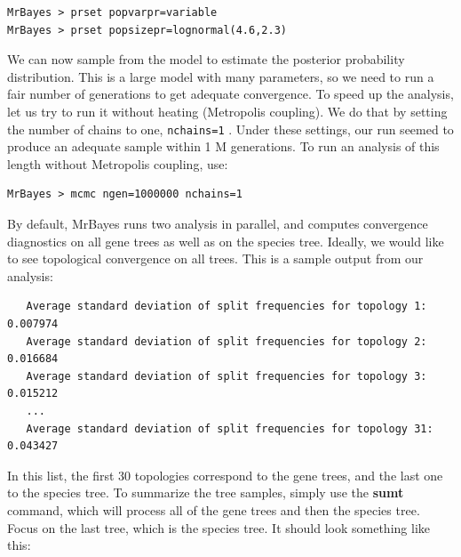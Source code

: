 \documentclass[12pt]{book}
\newcommand{\ttt}[1]{\texttt{#1} }
\begin{document}
\begin{singlespacing}
\begin{verbatim}
MrBayes > prset popvarpr=variable
MrBayes > prset popsizepr=lognormal(4.6,2.3)
\end{verbatim}
\end{singlespacing}

We can now sample from the model to estimate the posterior probability distribution. This is a
large model with many parameters, so we need to run a fair number of generations to get adequate
convergence. To speed up the analysis, let us try to run it without heating (Metropolis coupling).
We do that by setting the number of chains to one, \ttt{nchains=1}. Under these settings, our
run seemed to produce an adequate sample within 1 M generations. To run an analysis of this length
without Metropolis coupling, use:

\begin{verbatim}
MrBayes > mcmc ngen=1000000 nchains=1
\end{verbatim}

By default, MrBayes runs two analysis in parallel, and computes convergence diagnostics on all gene
trees as well as on the species tree. Ideally, we would like to see topological convergence on all
trees. This is a sample output from our analysis:

\footnotesize
\begin{singlespacing}
\begin{verbatim}
   Average standard deviation of split frequencies for topology 1: 0.007974
   Average standard deviation of split frequencies for topology 2: 0.016684
   Average standard deviation of split frequencies for topology 3: 0.015212
   ...
   Average standard deviation of split frequencies for topology 31: 0.043427
\end{verbatim}
\end{singlespacing}
\normalsize

In this list, the first 30 topologies correspond to the gene trees, and the last one to the species
tree.  To summarize the tree samples, simply use the \textbf{sumt} command, which will process all
of the gene trees and then the species tree. Focus on the last tree, which is the species tree. It
should look something like this:
\end{document}
